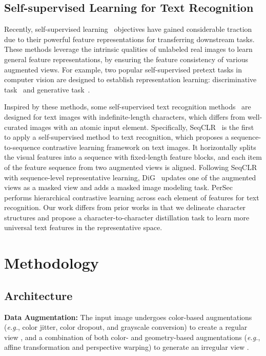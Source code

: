 \documentclass[10pt,twocolumn,letterpaper]{article}
\begin{document}
\subsection{Self-supervised Learning for Text Recognition}
Recently, self-supervised learning~\cite{Dino,SimCLR,IBoT,MAE,MoCo,SimMIM} objectives have gained considerable traction due to their powerful feature representations for transferring downstream tasks. These methods leverage the intrinsic qualities of unlabeled real images to learn general feature representations, by ensuring the feature consistency of various augmented views. 
For example, two popular self-supervised pretext tasks in computer vision are designed to establish representation learning: discriminative task~\cite{seqCLR,MoCo} and generative task~\cite{MAE,SimMIM}. 

Inspired by these methods, some self-supervised text recognition methods~\cite{seqCLR,DiG,Persec,zhang2023relational} are designed for text images with indefinite-length characters, which differs from well-curated images with an atomic input element. 
Specifically, SeqCLR~\cite{seqCLR} is the first to apply a self-supervised method to text recognition, which proposes a sequence-to-sequence contrastive learning framework on text images. It horizontally splits the visual features into a sequence with fixed-length feature blocks, and each item of the feature sequence from two augmented views is aligned. Following SeqCLR with sequence-level representative learning, DiG~\cite{DiG} updates one of the augmented views as a masked view and adds a masked image modeling task.
PerSec~\cite{Persec} performs hierarchical contrastive learning across each element of features for text recognition. 
Our work differs from prior works in that we delineate character structures and propose a character-to-character distillation task to learn more universal text features in the representative space. 

\section{Methodology}

\subsection{Architecture}

\noindent \textbf{Data Augmentation:}
The input image  undergoes color-based augmentations (\emph{e.g.}, color jitter, color dropout, and grayscale conversion) to create a regular view , and a combination of both color- and geometry-based augmentations (\emph{e.g.}, affine transformation and perspective warping) to generate an irregular view .
\end{document}
